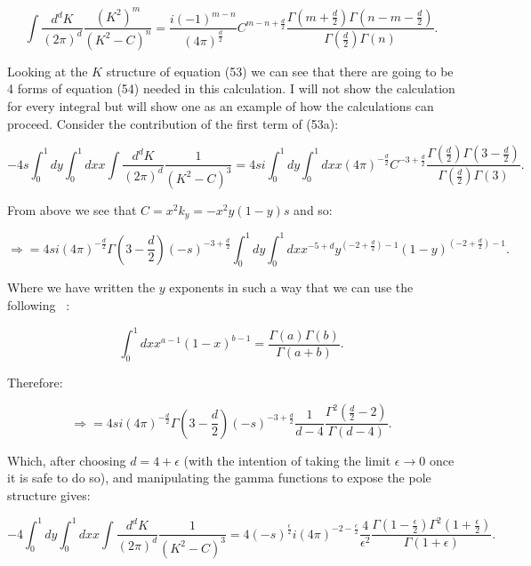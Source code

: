 	\begin{equation}
	\int\frac{d^{d}K}{(2\pi)^d}\frac{(K^2)^m}{(K^2-C)^n} = \frac{i(-1)^{m-n}}{(4\pi)^\frac{d}{2}}
	C^{m-n+\frac{d}{2}}\frac{\Gamma(m+\frac{d}{2})\Gamma(n-m-\frac{d}{2})}{\Gamma(\frac{d}{2})\Gamma(n)}.
	\end{equation}

	Looking at the $K$ structure of equation (53) we can see that there are going to be 4 forms
	of equation (54) needed in this calculation.  I will not show the calculation for every integral
	but will show one as an example of how the calculations can proceed.  Consider the contribution of the first term of (53a):

	\begin{equation}
	-4s\int_0^1dy\int_0^1dxx\int\frac{d^{d}K}{(2\pi)^d}\frac{1}{(K^2-C)^3} = 4si\int_0^1dy\int_0^1dxx(4\pi)^{-\frac{d}{2}}
	C^{-3+\frac{d}{2}}\frac{\Gamma(\frac{d}{2})\Gamma(3-\frac{d}{2})}{\Gamma(\frac{d}{2})\Gamma(3)}.
	\end{equation}

	From above we see that $C=x^2k_y=-x^2y(1-y)s$ and so:

	\begin{equation}
	\Rightarrow=4si(4\pi)^{-\frac{d}{2}}\Gamma(3-\frac{d}{2})(-s)^{-3+\frac{d}{2}}\int_0^1dy\int_0^1dxx^{-5+d}
	y^{\left(-2+\frac{d}{2}\right)-1}(1-y)^{\left(-2+\frac{d}{2}\right)-1}.
	\end{equation}

	Where we have written the $y$ exponents in such a way that we can use the following ~\cite{field}:

	\begin{equation}
	\int_0^1dxx^{a-1}(1-x)^{b-1}=\frac{\Gamma(a)\Gamma(b)}{\Gamma(a+b)}.
	\end{equation}

	Therefore:

	\begin{equation}
	\Rightarrow=4si(4\pi)^{-\frac{d}{2}}\Gamma\left(3-\frac{d}{2}\right)(-s)^{-3+\frac{d}{2}}
	\frac{1}{d-4}\frac{\Gamma^2(\frac{d}{2}-2)}{\Gamma(d-4)}.
	\end{equation}

	Which, after choosing $d=4+\epsilon$ (with the intention of taking the limit $\epsilon\rightarrow0$
	once it is safe to do so), and manipulating the gamma functions to expose the pole structure gives:

	\begin{equation}
	-4\int_0^1dy\int_0^1dxx\int\frac{d^{d}K}{(2\pi)^d}\frac{1}{(K^2-C)^3} = 4(-s)^{\frac{\epsilon}{2}}i(4\pi)^{-2-\frac{\epsilon}{2}}
	\frac{4}{\epsilon^2}\frac{\Gamma\left(1-\frac{\epsilon}{2}\right)\Gamma^2\left(1+\frac{\epsilon}{2}\right)}{\Gamma(1+\epsilon)}.
	\end{equation}

